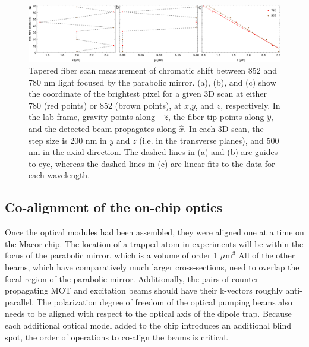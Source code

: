 \begin{figure}
    \centering
    \includegraphics[width=\textwidth]{Images/fiberscan_852_780_xyz_fig.pdf}
    \caption{Tapered fiber scan measurement of chromatic shift between 852 and 780 nm light focused by the parabolic mirror. (a), (b), and (c) show the coordinate of the brightest pixel for a given 3D scan at either 780 (red points) or 852 (brown points), at $x$,$y$, and $z$, respectively. In the lab frame, gravity points along $-\hat{z}$, the fiber tip points along $\hat{y}$, and the detected beam propagates along $\hat{x}$. In each 3D scan, the step size is 200 nm in $y$ and $z$ (i.e. in the transverse planes), and 500 nm in the axial direction. The dashed lines in (a) and (b) are guides to eye, whereas the dashed lines in (c) are linear fits to the data for each wavelength.}
    \label{fig:780_852_fiber_scan}
\end{figure}

\subsection{Co-alignment of the on-chip optics}

Once the optical modules had been assembled, they were aligned one at a time on the Macor chip. The location of a trapped atom in experiments will be within the focus of the parabolic mirror, which is a volume of order 1 $\mu \mathrm{m}$$^3$ All of the other beams, which have comparatively much larger cross-sections, need to overlap the focal region of the parabolic mirror. Additionally, the pairs of counter-propagating MOT and excitation beams should have their k-vectors roughly anti-parallel. The polarization degree of freedom of the optical pumping beams also needs to be aligned with respect to the optical axis of the dipole trap. Because each additional optical model added to the chip introduces an additional blind spot, the order of operations to co-align the beams is critical. 


